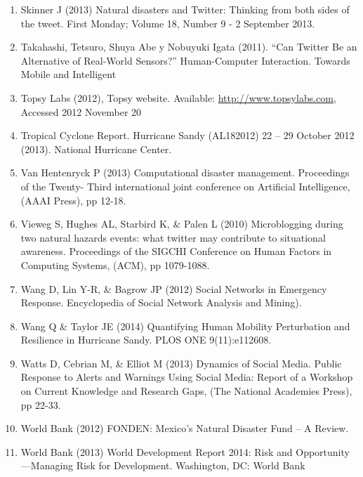 \documentclass[]{article}
\begin{document}
\begin{enumerate}
\item
  Skinner J (2013) Natural disasters and Twitter: Thinking from both
  sides of the tweet. First Monday; Volume 18, Number 9 - 2 September
  2013.
\item
  Takahashi, Tetsuro, Shuya Abe y Nobuyuki Igata (2011). ``Can Twitter
  Be an Alternative of Real-World Sensors?'' Human-Computer Interaction.
  Towards Mobile and Intelligent
\item
  Topsy Labs (2012), Topsy website. Available:
  \url{http://www.topsylabs.com}, Accessed 2012 November 20
\item
  Tropical Cyclone Report. Hurricane Sandy (AL182012) 22 -- 29 October
  2012 (2013). National Hurricane Center.
\item
  Van Hentenryck P (2013) Computational disaster management. Proceedings
  of the Twenty- Third international joint conference on Artificial
  Intelligence, (AAAI Press), pp 12-18.
\item
  Vieweg S, Hughes AL, Starbird K, \& Palen L (2010) Microblogging
  during two natural hazards events: what twitter may contribute to
  situational awareness. Proceedings of the SIGCHI Conference on Human
  Factors in Computing Systems, (ACM), pp 1079-1088.
\item
  Wang D, Lin Y-R, \& Bagrow JP (2012) Social Networks in Emergency
  Response. Encyclopedia of Social Network Analysis and Mining).
\item
  Wang Q \& Taylor JE (2014) Quantifying Human Mobility Perturbation and
  Resilience in Hurricane Sandy. PLOS ONE 9(11):e112608.
\item
  Watts D, Cebrian M, \& Elliot M (2013) Dynamics of Social Media.
  Public Response to Alerts and Warnings Using Social Media: Report of a
  Workshop on Current Knowledge and Research Gaps, (The National
  Academies Press), pp 22-33.
\item
  World Bank (2012) FONDEN: Mexico's Natural Disaster Fund -- A Review.
\item
  World Bank (2013) World Development Report 2014: Risk and
  Opportunity---Managing Risk for Development. Washington, DC: World
  Bank
\end{enumerate}
\end{document}
